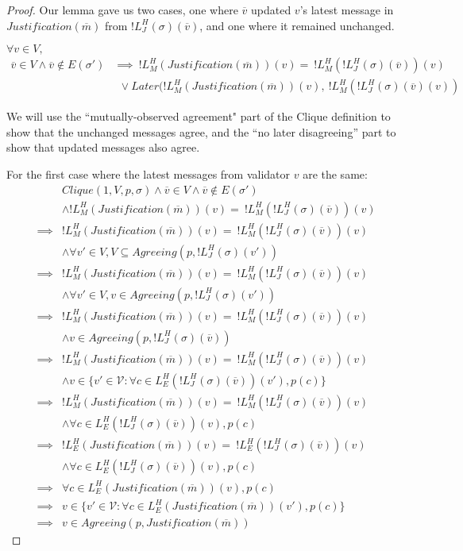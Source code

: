 \begin{proof}
Our lemma gave us two cases, one where $\overline{v}$ updated $v$'s latest message in $Justification(\overline{m})$ from $!L^H_J(\sigma)(\overline{v})$, and one where it remained unchanged.

$\forall v \in V,$
\begin{align}
\overline{v} \in V \land \overline{v} \notin E(\sigma') &\implies~!L^H_M(Justification(\overline{m}))(v) =~!L^H_M(!L^H_J(\sigma)(\overline{v}))(v) \\
&~~\lor Later(!L^H_M(Justification(\overline{m}))(v),~!L^H_M(!L^H_J(\sigma)(\overline{v})(v))
\end{align}

We will use the ``mutually-observed agreement" part of the Clique definition to show that the unchanged messages agree, and the ``no later disagreeing'' part to show that updated messages also agree.

For the first case where the latest messages from validator $v$ are the same:
\begin{align}
        &Clique(1, V, p, \sigma) \land \overline{v} \in V \land \overline{v} \notin E(\sigma') \\
        &\land !L^H_M(Justification(\overline{m}))(v) =~!L^H_M(!L^H_J(\sigma)(\overline{v}))(v) \\
\implies&!L^H_M(Justification(\overline{m}))(v) =~!L^H_M(!L^H_J(\sigma)(\overline{v}))(v) \\
        &\land \forall v' \in V, V \subseteq Agreeing(p, !L^H_J(\sigma)(v')) \\
\implies&!L^H_M(Justification(\overline{m}))(v) =~!L^H_M(!L^H_J(\sigma)(\overline{v}))(v) \\
        &\land \forall v' \in V, v \in Agreeing(p, !L^H_J(\sigma)(v')) \\
\implies&!L^H_M(Justification(\overline{m}))(v) =~!L^H_M(!L^H_J(\sigma)(\overline{v}))(v) \\
        &\land v \in Agreeing(p, !L^H_J(\sigma)(\overline{v})) \\
\implies&!L^H_M(Justification(\overline{m}))(v) =~!L^H_M(!L^H_J(\sigma)(\overline{v}))(v) \\
        &\land v \in \{v' \in \mathcal{V} : \forall c \in L^H_E(!L^H_J(\sigma)(\overline{v}))(v'), p(c)\}  \\
\implies&!L^H_M(Justification(\overline{m}))(v) =~!L^H_M(!L^H_J(\sigma)(\overline{v}))(v) \\
        &\land \forall c \in L^H_E(!L^H_J(\sigma)(\overline{v}))(v), p(c)  \\
\implies&!L^H_E(Justification(\overline{m}))(v) =~!L^H_E(!L^H_J(\sigma)(\overline{v}))(v) \\
        &\land \forall c \in L^H_E(!L^H_J(\sigma)(\overline{v}))(v), p(c)  \\
\implies&\forall c \in L^H_E(Justification(\overline{m}))(v), p(c)  \\
\implies&v \in \{v' \in \mathcal{V} : \forall c \in L^H_E(Justification(\overline{m}))(v'), p(c)\}  \\
\implies&v \in Agreeing(p, Justification(\overline{m}))
\end{align}


\end{proof}
